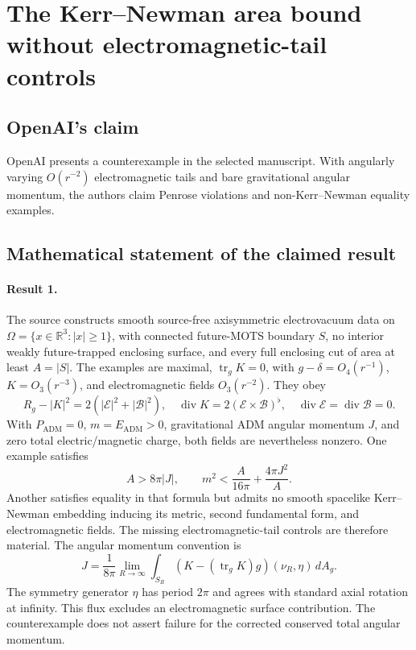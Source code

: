 \documentclass[11pt]{article}
\begin{document}
\section*{The Kerr–Newman area bound without electromagnetic-tail controls}

\subsection{OpenAI's claim}
OpenAI presents a counterexample in the selected manuscript. With angularly varying $O(r^{-2})$ electromagnetic tails and bare gravitational angular momentum, the authors claim Penrose violations and non-Kerr--Newman equality examples.

\subsection{Mathematical statement of the claimed result}
\paragraph{Result 1.} The source constructs smooth source-free axisymmetric electrovacuum data on \(\Omega=\{x\in\mathbb R^3:|x|\ge1\}\), with connected future-MOTS boundary \(S\), no interior weakly future-trapped enclosing surface, and every full enclosing cut of area at least \(A=|S|\). The examples are maximal, \(\operatorname{tr}_gK=0\), with \(g-\delta=O_4(r^{-1})\), \(K=O_3(r^{-3})\), and electromagnetic fields \(O_3(r^{-2})\). They obey
\[
 R_g-|K|^2=2(|\mathcal E|^2+|\mathcal B|^2),\quad
 \operatorname{div}K=2(\mathcal E\times\mathcal B)^\flat,\quad
 \operatorname{div}\mathcal E=\operatorname{div}\mathcal B=0.
\]
With $P_{\mathrm{ADM}}=0$, $m=E_{\mathrm{ADM}}>0$, gravitational ADM angular momentum $J$, and zero total electric/magnetic charge, both fields are nevertheless nonzero. One example satisfies
\[
 A>8\pi|J|,\qquad m^2<\frac A{16\pi}+\frac{4\pi J^2}{A}.
\]
Another satisfies equality in that formula but admits no smooth spacelike Kerr--Newman embedding inducing its metric, second fundamental form, and electromagnetic fields. The missing electromagnetic-tail controls are therefore material. The angular momentum convention is
\[
 J=\frac1{8\pi}\lim_{R\to\infty}\int_{S_R}(K-(\operatorname{tr}_gK)g)(\nu_R,\eta)\,dA_g.
\]
The symmetry generator $\eta$ has period $2\pi$ and agrees with standard axial rotation at infinity. This flux excludes an electromagnetic surface contribution. The counterexample does not assert failure for the corrected conserved total angular momentum.
\end{document}
